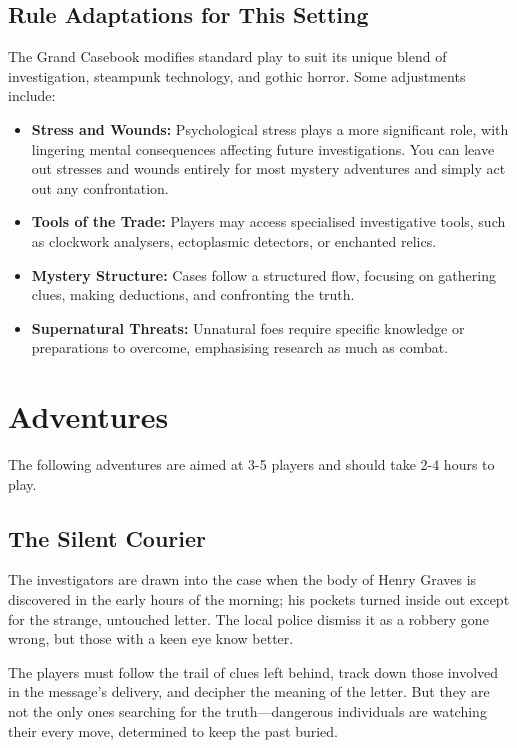 \subsection{Rule Adaptations for This Setting}

The Grand Casebook modifies standard play to suit its unique blend of investigation, steampunk technology, and gothic horror. Some adjustments include:

\begin{itemize}
    \item \textbf{Stress and Wounds:} Psychological stress plays a more significant role, with lingering mental consequences affecting future investigations. You can leave out stresses and wounds entirely for most mystery adventures and simply act out any confrontation.
    \item \textbf{Tools of the Trade:} Players may access specialised investigative tools, such as clockwork analysers, ectoplasmic detectors, or enchanted relics.
    \item \textbf{Mystery Structure:} Cases follow a structured flow, focusing on gathering clues, making deductions, and confronting the truth.
    \item \textbf{Supernatural Threats:} Unnatural foes require specific knowledge or preparations to overcome, emphasising research as much as combat.
\end{itemize}

\section{Adventures}

The following adventures are aimed at 3-5 players and should take 2-4 hours to play. 




\subsection{The Silent Courier}

The investigators are drawn into the case when the body of Henry Graves is discovered in the early hours of the morning; his pockets turned inside out except for the strange, untouched letter. The local police dismiss it as a robbery gone wrong, but those with a keen eye know better.

The players must follow the trail of clues left behind, track down those involved in the message’s delivery, and decipher the meaning of the letter. But they are not the only ones searching for the truth—dangerous individuals are watching their every move, determined to keep the past buried.

